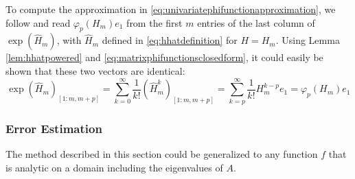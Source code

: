 To compute the approximation in \eqref{eq:univariatephifunctionapproximation}, we follow \cite{niesen2012} and read $\varphi_p(H_m) e_1$
from the first $m$ entries of the last column of $\exp(\hat{H}_m)$, with $\hat{H}_m$ defined in \eqref{eq:hhatdefinition} for $H = H_m$.
Using Lemma \ref{lem:hhatpowered} and \eqref{eq:matrixphifunctionsclosedform}, it could easily be shown that these two vectors are identical:
\begin{equation*}
    \exp(\hat{H}_m)_{[1 : m, m+p]}
    = \sum_{k=0}^{\infty}{\frac{1}{k!} (\hat{H}_m^k)_{[1 : m, m+p]}}
    = \sum_{k=p}^{\infty}{\frac{1}{k!} H_m^{k-p}e_1} = \varphi_p(H_m) e_1
\end{equation*}


\subsubsection{Error Estimation}
The method described in this section could be generalized to any function $f$ that is
analytic on a domain including the eigenvalues of $A$.

